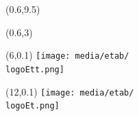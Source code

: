 \documentclass[a4paper]{article}
\newcommand{\NNT}{2019SACLT001} 															%
\newcommand{\logoEt}{philips} 																%
\newcommand{\vpos}{0.1}																	%
\newcommand{\hpos}{12}																		%
\newcommand{\logoEtt}{TPT}  																%
\newcommand{\vpostt}{0.1} 																	%
\newcommand{\hpostt}{6}																	%
\begin{document}
\begin{textblock}{1}(0.6,9.5)
	
	\Huge{}
\end{textblock}

\begin{textblock}{1}(0.6,3)
	\Large{\rotatebox{90}{\color{white}{NNT : \NNT}}}
\end{textblock}


                            

\begin{textblock}{1}(\hpostt,\vpostt)
	\texttt{[image: media/etab/\\logoEtt.png]}
\end{textblock}

\begin{textblock}{1}(\hpos,\vpos)
		\texttt{[image: media/etab/\\logoEt.png]}	
\end{textblock}
\end{document}
